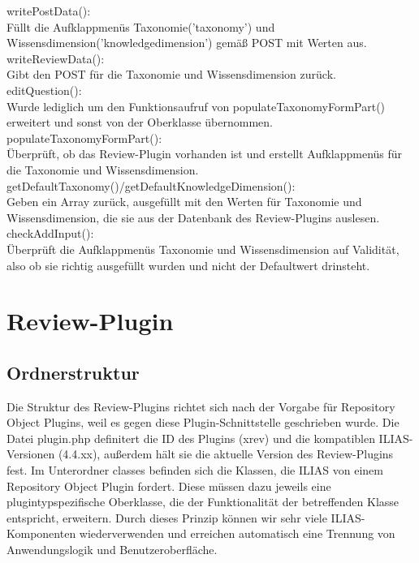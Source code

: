 \documentclass[a4paper]{scrreprt}
\begin{document}
writePostData():\\
Füllt die Aufklappmenüs Taxonomie('taxonomy') und Wissensdimension('knowledge\textunderscore dimension') gemäß POST mit Werten aus.\\

writeReviewData():\\
Gibt den POST für die Taxonomie und Wissensdimension zurück.\\

editQuestion():\\
Wurde lediglich um den Funktionsaufruf von populateTaxonomyFormPart() erweitert und sonst von der Oberklasse übernommen.\\

populateTaxonomyFormPart():\\
Überprüft, ob das Review-Plugin vorhanden ist und erstellt Aufklappmenüs für die Taxonomie und Wissensdimension.\\

getDefaultTaxonomy()/getDefaultKnowledgeDimension():\\
Geben ein Array zurück, ausgefüllt mit den Werten für Taxonomie und Wissensdimension, die sie aus der Datenbank des Review-Plugins auslesen.\\

checkAddInput():\\
Überprüft die Aufklappmenüs Taxonomie und Wissensdimension auf Validität, also ob sie richtig ausgefüllt wurden und nicht der Defaultwert drinsteht.\\


\section{Review-Plugin}

\subsection{Ordnerstruktur}

Die Struktur des Review-Plugins richtet sich nach der Vorgabe für Repository Object Plugins, weil es gegen diese Plugin-Schnittstelle geschrieben wurde. Die Datei plugin.php definitert die ID des Plugins (xrev) und die kompatiblen ILIAS-Versionen (4.4.xx), außerdem hält sie die aktuelle Version des Review-Plugins fest.
Im Unterordner classes befinden sich die Klassen, die ILIAS von einem Repository Object Plugin fordert. 
Diese müssen dazu jeweils eine plugintypspezifische Oberklasse, die der Funktionalität der betreffenden Klasse entspricht, erweitern. 
Durch dieses Prinzip können wir sehr viele ILIAS-Komponenten wiederverwenden und erreichen automatisch eine Trennung von Anwendungslogik und Benutzeroberfläche.
\end{document}
